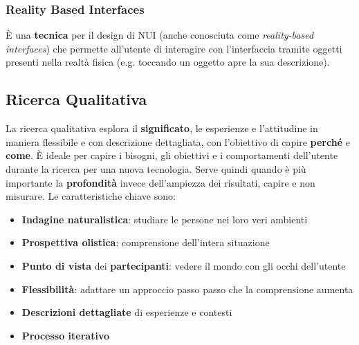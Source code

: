 \subsubsection{Reality Based Interfaces}
È una \textbf{tecnica} per il design di NUI (anche conosciuta come \textit{reality-based interfaces}) che permette all'utente di interagire con l'interfaccia tramite oggetti presenti nella realtà fisica (e.g. toccando un oggetto apre la sua descrizione).

\subsection{Ricerca Qualitativa}
La ricerca qualitativa esplora il \textbf{significato}, le esperienze e l'attitudine in maniera flessibile e con descrizione dettagliata, con l'obiettivo di capire \textbf{perché} e \textbf{come}. È ideale per capire i bisogni, gli obiettivi e i comportamenti dell'utente durante la ricerca per una nuova tecnologia. Serve quindi quando è più importante la \textbf{profondità} invece dell'ampiezza dei risultati, capire e non misurare. Le caratteristiche chiave sono:
\begin{itemize}
	\item \textbf{Indagine naturalistica}: studiare le persone nei loro veri ambienti
	\item \textbf{Prospettiva olistica}: comprensione dell'intera situazione
	\item \textbf{Punto di vista} dei \textbf{partecipanti}: vedere il mondo con gli occhi dell'utente
	\item \textbf{Flessibilità}: adattare un approccio passo passo che la comprensione aumenta
	\item \textbf{Descrizioni dettagliate} di esperienze e contesti
	\item \textbf{Processo iterativo}
\end{itemize}

